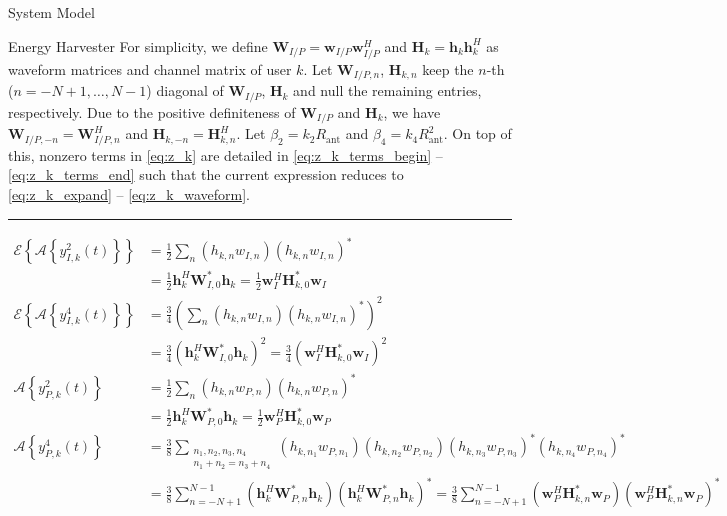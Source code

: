 \documentclass{IEEEtran}
\begin{document}
\begin{section}{System Model}
\begin{subsection}{Energy Harvester}
		For simplicity, we define $\boldsymbol{W}_{I/P}=\boldsymbol{w}_{I/P}\boldsymbol{w}_{I/P}^H$ and $\boldsymbol{H}_k=\boldsymbol{h}_k\boldsymbol{h}_k^H$ as waveform matrices and channel matrix of user $k$. Let $\boldsymbol{W}_{I/P,n}$, $\boldsymbol{H}_{k,n}$ keep the $n$-th ($n=-N+1,\dots,N-1$) diagonal of $\boldsymbol{W}_{I/P}$, $\boldsymbol{H}_k$ and null the remaining entries, respectively. Due to the positive definiteness of $\boldsymbol{W}_{I/P}$ and $\boldsymbol{H}_k$, we have $\boldsymbol{W}_{I/P,-n}=\boldsymbol{W}_{I/P,n}^H$ and $\boldsymbol{H}_{k,-n}=\boldsymbol{H}_{k,n}^H$. Let $\beta_2={k_2}{R_{\text{ant}}}$ and $\beta_4={k_4}{R_{\text{ant}}^2}$. On top of this, nonzero terms in \ref{eq:z_k} are detailed in \ref{eq:z_k_terms_begin} -- \ref{eq:z_k_terms_end} such that the current expression reduces to \ref{eq:z_k_expand} -- \ref{eq:z_k_waveform}.
		\begin{figure*}[b]
			\hrule
			\begin{align}
				\mathcal{E}\left\{\mathcal{A}\left\{y_{I,k}^2(t)\right\}\right\}
				& = \frac{1}{2}\sum_n{(h_{k,n}w_{I,n})(h_{k,n}w_{I,n})^*}\label{eq:z_k_terms_begin}\\
				& = \frac{1}{2}\boldsymbol{h}_k^H\boldsymbol{W}_{I,0}^*\boldsymbol{h}_k = \frac{1}{2}\boldsymbol{w}_I^H\boldsymbol{H}_{k,0}^*\boldsymbol{w}_I\\
				\mathcal{E}\left\{\mathcal{A}\left\{y_{I,k}^4(t)\right\}\right\}
				& = \frac{3}{4}\left(\sum_n{(h_{k,n}w_{I,n})(h_{k,n}w_{I,n})^*}\right)^2\\
				& = \frac{3}{4}(\boldsymbol{h}_k^H\boldsymbol{W}_{I,0}^*\boldsymbol{h}_k)^2 = \frac{3}{4}(\boldsymbol{w}_I^H\boldsymbol{H}_{k,0}^*\boldsymbol{w}_I)^2\\
				\mathcal{A}\left\{y_{P,k}^2(t)\right\}
				& = \frac{1}{2}\sum_n{(h_{k,n}w_{P,n})(h_{k,n}w_{P,n})^*}\\
				& = \frac{1}{2}\boldsymbol{h}_k^H\boldsymbol{W}_{P,0}^*\boldsymbol{h}_k = \frac{1}{2}\boldsymbol{w}_P^H\boldsymbol{H}_{k,0}^*\boldsymbol{w}_P\\
				\mathcal{A}\left\{y_{P,k}^4(t)\right\}
				& = \frac{3}{8}\sum_{\substack{{n_1},{n_2},{n_3},{n_4}\\{n_1}+{n_2}={n_3}+{n_4}}}{(h_{k,{n_1}}w_{P,{n_1}})(h_{k,{n_2}}w_{P,{n_2}})(h_{k,{n_3}}w_{P,{n_3}})^*(h_{k,{n_4}}w_{P,{n_4}})^*}\\
				& = \frac{3}{8}\sum_{n=-N+1}^{N-1}(\boldsymbol{h}_k^H\boldsymbol{W}_{P,n}^*\boldsymbol{h}_k)(\boldsymbol{h}_k^H\boldsymbol{W}_{P,n}^*\boldsymbol{h}_k)^* = \frac{3}{8}\sum_{n=-N+1}^{N-1}(\boldsymbol{w}_P^H\boldsymbol{H}_{k,n}^*\boldsymbol{w}_P)(\boldsymbol{w}_P^H\boldsymbol{H}_{k,n}^*\boldsymbol{w}_P)^*\label{eq:z_k_terms_end}

\end{align}
\end{figure*}
\end{subsection}
\end{section}
\end{document}
